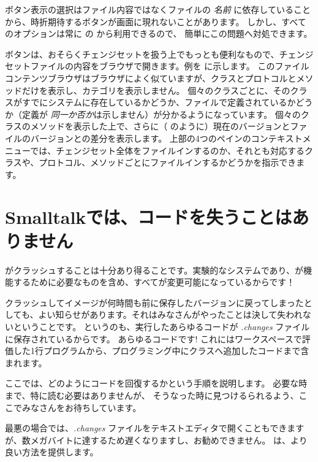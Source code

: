 \documentclass[a4paper,10pt,twoside]{book}
\begin{document}
ボタン表示の選択はファイル内容ではなくファイルの \emph{名前} に依存していることから、時折期待するボタンが画面に現れないことがあります。
しかし、すべてのオプションは常に \actclick の  から利用できるので、
簡単にこの問題へ対処できます。

 ボタンは、おそらくチェンジセットを扱う上でもっとも便利なもので、チェンジセットファイルの内容をブラウザで開きます。例を  に示します。
このファイルコンテンツブラウザはブラウザによく似ていますが、クラスとプロトコルとメソッドだけを表示し、カテゴリを表示しません。
個々のクラスごとに、そのクラスがすでにシステムに存在しているかどうか、ファイルで定義されているかどうか（定義が \emph{同一か否か}は示しません）が分かるようになっています。
個々のクラスのメソッドを表示した上で、さらに（ のように）現在のバージョンとファイルのバージョンとの差分を表示します。
上部の4つのペインのコンテキストメニューでは、チェンジセット全体をファイルインするのか、それとも対応するクラスや、プロトコル、メソッドごとにファイルインするかどうかを指示できます。

\section{Smalltalkでは、コードを失うことはありません}

\pharo がクラッシュすることは十分あり得ることです。実験的なシステムであり、\pharo が機能するために必要なものを含め、すべてが変更可能になっているからです！


クラッシュしてイメージが何時間も前に保存したバージョンに戻ってしまったとしても、よい知らせがあります。それはみなさんがやったことは決して失われないということです。
というのも、実行したあらゆるコードが \emph{.changes} ファイルに保存されているからです。
あらゆるコードです!
これにはワークスペースで評価した1行プログラムから、プログラミング中にクラスへ追加したコードまで含まれます。

ここでは、どのようにコードを回復するかという手順を説明します。
必要な時まで、特に読む必要はありませんが、
そうなった時に見つけるられるよう、ここでみなさんをお待ちしています。

最悪の場合では、\emph{.changes} ファイルをテキストエディタで開くこともできますが、数メガバイトに達するため遅くなりますし、お勧めできません。
\pharo は、より良い方法を提供します。
\end{document}
